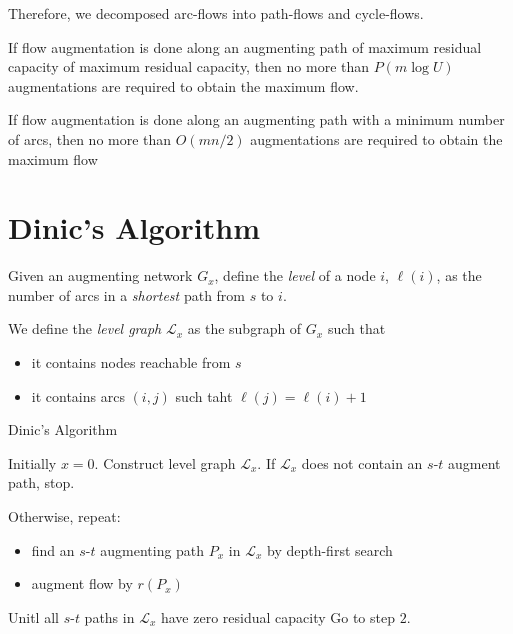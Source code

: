 Therefore, we decomposed arc-flows into path-flows and cycle-flows.


\begin{theorem}
If flow augmentation is done along an augmenting path of maximum residual capacity of maximum residual capacity, then no more than $P(m\log U)$ augmentations are required to obtain the maximum flow.
\end{theorem}

\begin{theorem}
If flow augmentation is done along an augmenting path with a minimum number of arcs, then no more than $O(mn/2)$ augmentations are required to obtain the maximum flow
\end{theorem}

\section{Dinic’s Algorithm}
\begin{definition}
Given an augmenting network $G_x$, define the \emph{level} of a node $i$, $\ell(i)$, as the number of arcs in a \emph{shortest} path from $s$ to $i$.

We define the \emph{level graph} $\mathcal{L}_x$ as the subgraph of $G_x$ such that
\begin{itemize}
\item
it contains nodes reachable from $s$
\item
it contains arcs $(i,j)$ such taht $\ell(j) = \ell(i)+1$
\end{itemize}
\end{definition}

\begin{algorithm}[htb] 
\caption{Dinic's Algorithm} 
\label{alg:SM} 
\begin{algorithmic}[1] %
\STATE 
Initially $x=0$.
\STATE
Construct level graph $\mathcal{L}_x$.
\STATE
If $\mathcal{L}_x$ does not contain an $s$-$t$ augment path, stop.
\item
Otherwise, repeat:
\begin{itemize}
\item
find an $s$-$t$ augmenting path $P_x$ in $\mathcal{L}_x$ by depth-first search
\item
augment flow by $r(P_x)$
\end{itemize}
Unitl all $s$-$t$ paths in $\mathcal{L}_x$ have zero residual capacity
\STATE Go to step $2$.
\end{algorithmic}
\end{algorithm}

